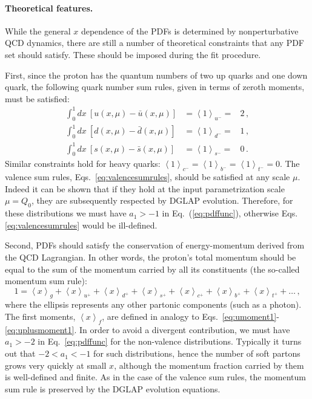 \paragraph*{Theoretical features.}
While the general $x$ dependence of the PDFs is determined by
nonperturbative QCD dynamics, there are still a number
of theoretical constraints that any PDF set should satisfy. 
%
These should be imposed during the fit procedure.

First, since the proton has the quantum numbers of two up quarks and one 
down quark, the following quark number sum rules, given in terms of zeroth
moments, must be satisfied: 
\begin{eqnarray}
\int_{0}^{1}dx\ \left[u(x,\mu)-\bar{u}(x,\mu)\right] 
& =\left\langle 1\right\rangle _{u^{-}}= & 2 \, ,\nonumber \\
\int_{0}^{1}dx\ \left[d(x,\mu)-\bar{d}(x,\mu)\right] 
& =\left\langle 1\right\rangle _{d^{-}}= & 1 \, ,
\label{eq:valencesumrules}\\
\int_{0}^{1}dx\ \left[s(x,\mu)-\bar{s}(x,\mu)\right] 
& =\left\langle 1\right\rangle _{s^{-}}= & 0 \, .\nonumber
\end{eqnarray}
%
Similar constraints hold for heavy quarks: 
$\left\langle 1\right\rangle _{c^{-}}=\left\langle 1\right\rangle _{b^{-}}
=\left\langle 1\right\rangle _{t^{-}}=0$.
%
The valence sum rules, Eqs.~\eqref{eq:valencesumrules}, should be satisfied at 
any scale $\mu$. 
%
Indeed it can be shown that if they hold at the input parametrization scale 
$\mu=Q_0$, they are subsequently respected by DGLAP evolution.
%
Therefore, for these distributions we must have $a_1>-1$ in
Eq.~(\ref{eq:pdffunc}), otherwise Eqs.\eqref{eq:valencesumrules} 
would be ill-defined.

Second, PDFs should satisfy the conservation of energy-momentum derived from
the QCD Lagrangian.
%
In other words, the proton's total momentum should be equal 
to the sum of the momentum carried by all its constituents
(the so-called momentum sum rule):
\begin{equation}
\label{eq:mom}
1 
= 
\left\langle x\right\rangle _{g}
+
\left\langle x\right\rangle _{u^{+}}
+
\left\langle x\right\rangle _{d^{+}}
+
\left\langle x\right\rangle _{s^{+}}
+
\left\langle x\right\rangle _{c^{+}}
+
\left\langle x\right\rangle _{b^{+}}
+
\left\langle x\right\rangle _{t^{+}}+\ldots\,,
\end{equation}
%
where the ellipsis represents any other partonic components (such
as a photon). 
%
The first moments, $\left\langle x\right\rangle _{f}$, are defined in analogy 
to Eqs.~\eqref{eq:umoment1}-\eqref{eq:uplusmoment1}. 
%
In order to avoid a divergent contribution, we must have $a_1>-2$ in 
Eq.~\eqref{eq:pdffunc} for the non-valence distributions.
%
Typically it turns out that $-2<a_1<-1$ for such distributions, hence 
the number of soft partons grows very quickly at small $x$, although the 
momentum fraction carried by them is well-defined and finite.
%
As in the case of the valence sum rules, the momentum
sum rule is preserved by the DGLAP evolution equations.

